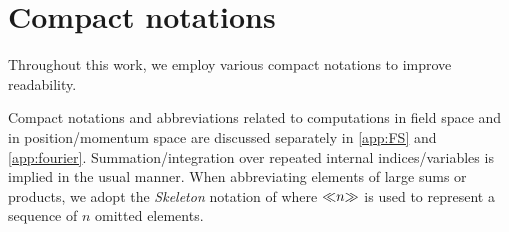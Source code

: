\section{Compact notations}\label{sec:compactNotations}
Throughout this work, we employ various compact notations to improve readability.

Compact notations and abbreviations related to computations in field space and in position/momentum space are discussed separately in \cref{app:FS} and \cref{app:fourier}.
Summation/integration over repeated internal indices/variables is implied in the usual manner.
When abbreviating elements of large sums or products, we adopt the \textit{Skeleton} notation of \WAMwR{} where $\skeleton{n}$ is used to represent a sequence of $n$ omitted elements.





